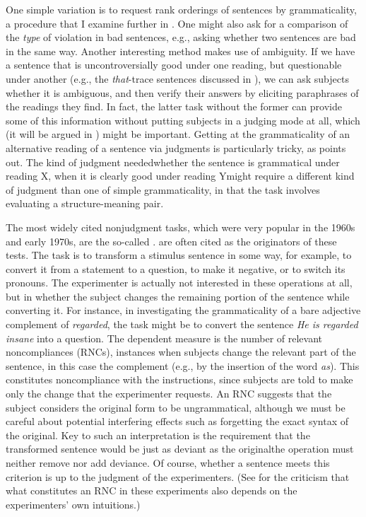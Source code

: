  One simple variation is to request rank orderings of sentences by grammaticality, a procedure
that I examine further in . One might also ask for a comparison of the \textit{type} of violation in bad sentences, e.g., asking whether two sentences are bad in the same way. Another interesting method makes use of ambiguity. If we have a sentence that is uncontroversially good under one reading, but questionable under another (e.g., the \textit{that}-trace sentences discussed in ), we can ask subjects whether it is ambiguous, and then verify their answers by eliciting paraphrases of the readings they find. In fact, the latter task without the former can provide some of this information without putting subjects in a judging mode at all, which (it will be argued in ) might be important. Getting at the grammaticality of an alternative reading of a sentence via judgments is particularly tricky, as \citet{Householder1973} points out. The kind of judgment needed\schdash{}whether the sentence is grammatical under reading X, when it is clearly good under reading Y\schdash{}might require a different kind of judgment than one of simple grammaticality, in that the task involves evaluating a structure-meaning pair.

The most widely cited nonjudgment tasks, which were very popular in the 1960s and early 1970s, are the so-called . \citet{QuirkEtAl1966} are often cited as the originators of these tests. The task is to transform a stimulus sentence in some way, for example, to convert it from a statement to a question, to make it negative, or to switch its pronouns. The experimenter is actually not interested in these operations at all, but in whether the subject changes the remaining portion of the sentence while converting it. For instance, in investigating the grammaticality of a bare adjective complement of \textit{regarded}, the task might be to convert the sentence \textit{He is regarded insane} into a question. The dependent measure is the number of relevant noncompliances (RNCs), instances when subjects change the relevant part of the sentence, in this case the complement (e.g., by the insertion of the word \textit{as}). This constitutes noncompliance with the instructions, since subjects are told to make only the change that the experimenter requests. An RNC suggests that the subject considers the original form to be ungrammatical, although we must be careful about potential interfering effects such as forgetting the exact syntax of the original. Key to such an interpretation is the requirement that the transformed sentence would be just as deviant as the
original\schdash{}the operation must neither remove nor add deviance. Of course, whether a sentence meets this criterion is up to the judgment of the experimenters. (See \citet{Itkonen1979} for the criticism that what constitutes an RNC in these experiments also depends on the experimenters' own intuitions.)

